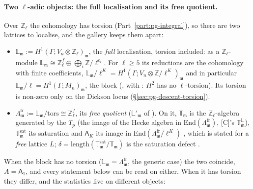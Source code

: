 \documentclass[11pt]{article}
\newcommand{\Z}{\mathbb{Z}}
\newcommand{\Zl}{\mathbb{Z}_\ell}
\newcommand{\T}{\mathbb{T}}
\newcommand{\m}{\mathfrak{m}}
\newcommand{\Ga}{\Gamma}
\begin{document}
\paragraph{Two $\ell$-adic objects: the full localisation and its free quotient.} Over $\Zl$ the cohomology has torsion
(Part~\ref{part:pg-integral}), so there are two lattices to localise, and the gallery keeps them apart:
\begin{itemize}[leftmargin=1.6em,itemsep=1pt]
\item $\mathbb L_\m:=H^{1}(\Ga;V_n\otimes\Zl)_\m$, the \emph{full} localisation, torsion included: as a $\Zl$-module
  $\mathbb L_\m\cong\Zl^{f}\oplus\bigoplus_i\Z/\ell^{e_i}$. For $\ell\ge5$ its reductions are the cohomology with finite coefficients,
  $\mathbb L_\m/\ell^{K}=H^{1}(\Ga;V_n\otimes\Z/\ell^{K})_\m$ and in particular $\mathbb L_\m/\ell=H^{1}(\Ga;M_n)_\m$, the block
  ({}, with {\ttfamily[C,~cl:bockstein]}: $H^{2}$ has no $\ell$-torsion). Its torsion is non-zero only on the Dickson locus
  (\S\ref{sec:pg-descent-torsion}).
\item $\Lambda^{\mathrm{fr}}_\m:=\mathbb L_\m/\mathrm{tors}\cong\Zl^{f}$, its \emph{free quotient} ($\mathbb L'_\m$ of {}). On it,
  $\T_\m$ is the $\Zl$-algebra generated by the $T_p$ (the image of the Hecke algebra in $\mathrm{End}(\Lambda^{\mathrm{fr}}_\m)$,
  [C]'s $\T^{\mathbb L}_\m$), $\T_\m^{\mathrm{sat}}$ its saturation and $\mathsf A_K$ its image in $\mathrm{End}(\Lambda^{\mathrm{fr}}_\m/\ell^{K})$
  {}, which is stated for a \emph{free} lattice $L$; $\delta=\mathrm{length}(\T^{\mathrm{sat}}_\m/\T_\m)$ is the
  saturation defect {}.
\end{itemize}
When the block has no torsion ($\mathbb L_\m=\Lambda^{\mathrm{fr}}_\m$, the generic case) the two coincide, $A=\mathsf A_1$, and every statement
below can be read on either. When it has torsion they differ, and the statistics live on different objects:
\end{document}
